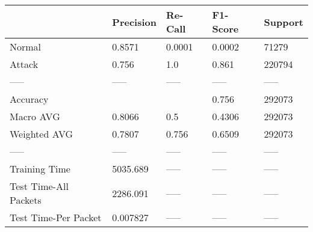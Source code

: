 \begin{tabular}{lllll}
\toprule
{} & Precision & Re-Call & F1-Score & Support \\
\midrule
Normal                &    0.8571 &  0.0001 &   0.0002 &   71279 \\
Attack                &     0.756 &     1.0 &    0.861 &  220794 \\
-----                 &     ----- &   ----- &    ----- &   ----- \\
Accuracy              &           &         &    0.756 &  292073 \\
Macro AVG             &    0.8066 &     0.5 &   0.4306 &  292073 \\
Weighted AVG          &    0.7807 &   0.756 &   0.6509 &  292073 \\
-----                 &     ----- &   ----- &    ----- &   ----- \\
Training Time         &  5035.689 &   ----- &    ----- &   ----- \\
Test Time-All Packets &  2286.091 &   ----- &    ----- &   ----- \\
Test Time-Per Packet  &  0.007827 &   ----- &    ----- &   ----- \\
\bottomrule
\end{tabular}
